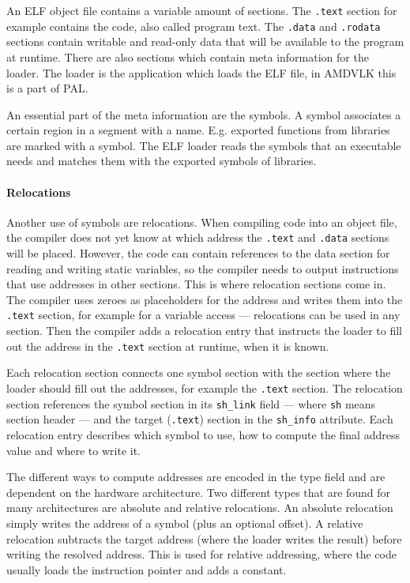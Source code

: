 An ELF object file contains a variable amount of sections. The \texttt{.text} section for example contains the code, also called program text.
The \texttt{.data} and \texttt{.rodata} sections contain writable and read-only data that will be available to the program at runtime. There are also sections which contain meta information for the loader. The loader is the application which loads the ELF file, in AMDVLK this is a part of PAL.

An essential part of the meta information are the symbols. A symbol associates a certain region in a segment with a name. E.g. exported functions from libraries are marked with a symbol. The ELF loader reads the symbols that an executable needs and matches them with the exported symbols of libraries.

\paragraph{Relocations} Another use of symbols are relocations. When compiling code into an object file, the compiler does not yet know at which address the \texttt{.text} and \texttt{.data} sections will be placed. However, the code can contain references to the data section for reading and writing static variables, so the compiler needs to output instructions that use addresses in other sections. This is where relocation sections come in. The compiler uses zeroes as  placeholders for the address and writes them into the \texttt{.text} section, for example for a variable access --- relocations can be used in any section. Then the compiler adds a relocation entry that instructs the loader to fill out the address in the \texttt{.text} section at runtime, when it is known.

Each relocation section connects one symbol section with the section where the loader should fill out the addresses, for example the \texttt{.text} section. The relocation section references the symbol section in its \texttt{sh\_link} field --- where \texttt{sh} means section header --- and the target (\texttt{.text}) section in the \texttt{sh\_info} attribute. Each relocation entry describes which symbol to use, how to compute the final address value and where to write it.

The different ways to compute addresses are encoded in the type field and are dependent on the hardware architecture. Two different types that are found for many architectures are absolute and relative relocations. An absolute relocation simply writes the address of a symbol (plus an optional offset). A relative relocation subtracts the target address (where the loader writes the result) before writing the resolved address. This is used for relative addressing, where the code usually loads the instruction pointer and adds a constant.~\cite{BenderskyRelocations}


